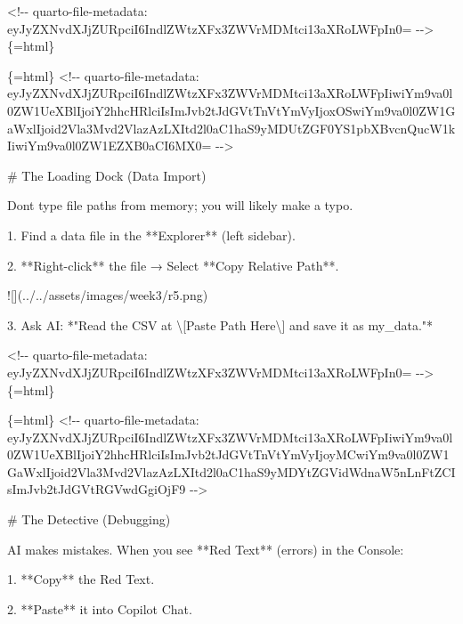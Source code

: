 \documentclass[
  letterpaper,
  DIV=11,
  numbers=noendperiod,
  oneside]{scrreprt}
\newenvironment{Shaded}{\begin{snugshade}}{\end{snugshade}}
\newcommand{\AlertTok}[1]{\textcolor[rgb]{0.68,0.00,0.00}{#1}}
\newcommand{\FunctionTok}[1]{\textcolor[rgb]{0.28,0.35,0.67}{#1}}
\newcommand{\InformationTok}[1]{\textcolor[rgb]{0.37,0.37,0.37}{#1}}
\newcommand{\NormalTok}[1]{\textcolor[rgb]{0.00,0.23,0.31}{#1}}
\newcommand{\SpecialStringTok}[1]{\textcolor[rgb]{0.13,0.47,0.30}{#1}}
\begin{document}
\begin{Shaded}
\begin{Highlighting}[numbers=left,,]
\InformationTok{\textasciigrave{}\textless{}!{-}{-} quarto{-}file{-}metadata: eyJyZXNvdXJjZURpciI6IndlZWtzXFx3ZWVrMDMtci13aXRoLWFpIn0= {-}{-}\textgreater{}\textasciigrave{}}\NormalTok{\{=html\}}

\InformationTok{\textasciigrave{}\textasciigrave{}\textasciigrave{}\{=html\}}
\InformationTok{\textless{}!{-}{-} quarto{-}file{-}metadata: eyJyZXNvdXJjZURpciI6IndlZWtzXFx3ZWVrMDMtci13aXRoLWFpIiwiYm9va0l0ZW1UeXBlIjoiY2hhcHRlciIsImJvb2tJdGVtTnVtYmVyIjoxOSwiYm9va0l0ZW1GaWxlIjoid2Vla3Mvd2VlazAzLXItd2l0aC1haS9yMDUtZGF0YS1pbXBvcnQucW1kIiwiYm9va0l0ZW1EZXB0aCI6MX0= {-}{-}\textgreater{}}
\InformationTok{\textasciigrave{}\textasciigrave{}\textasciigrave{}}

\FunctionTok{\# The Loading Dock (Data Import) }


\NormalTok{Don\textquotesingle{}t type file paths from memory; you will likely make a typo.}

\SpecialStringTok{1.  }\NormalTok{Find a data file in the **Explorer** (left sidebar).}

\SpecialStringTok{2.  }\NormalTok{**Right{-}click** the file → Select **Copy Relative Path**.}

    \AlertTok{![](../../assets/images/week3/r5.png)}

\SpecialStringTok{3.  }\NormalTok{Ask AI: *"Read the CSV at \textbackslash{}[Paste Path Here\textbackslash{}] and save it as my\_data."*}


\InformationTok{\textasciigrave{}\textless{}!{-}{-} quarto{-}file{-}metadata: eyJyZXNvdXJjZURpciI6IndlZWtzXFx3ZWVrMDMtci13aXRoLWFpIn0= {-}{-}\textgreater{}\textasciigrave{}}\NormalTok{\{=html\}}

\InformationTok{\textasciigrave{}\textasciigrave{}\textasciigrave{}\{=html\}}
\InformationTok{\textless{}!{-}{-} quarto{-}file{-}metadata: eyJyZXNvdXJjZURpciI6IndlZWtzXFx3ZWVrMDMtci13aXRoLWFpIiwiYm9va0l0ZW1UeXBlIjoiY2hhcHRlciIsImJvb2tJdGVtTnVtYmVyIjoyMCwiYm9va0l0ZW1GaWxlIjoid2Vla3Mvd2VlazAzLXItd2l0aC1haS9yMDYtZGVidWdnaW5nLnFtZCIsImJvb2tJdGVtRGVwdGgiOjF9 {-}{-}\textgreater{}}
\InformationTok{\textasciigrave{}\textasciigrave{}\textasciigrave{}}

\FunctionTok{\# The Detective (Debugging) }


\NormalTok{AI makes mistakes. When you see **Red Text** (errors) in the Console:}

\SpecialStringTok{1.  }\NormalTok{**Copy** the Red Text.}

\SpecialStringTok{2.  }\NormalTok{**Paste** it into Copilot Chat.}


\end{Highlighting}
\end{Shaded}
\end{document}
